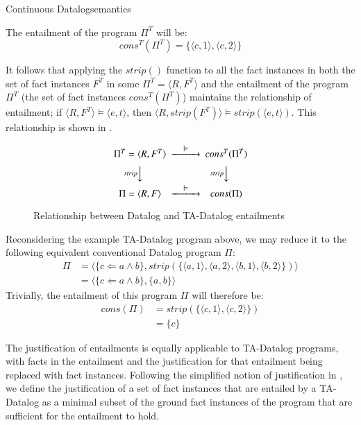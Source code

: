 \begin{nestedsection}{Continuous Datalog}{semantics}
\begin{definition}
The entailment of the program $\Pi^T$ will be:
\[cons^T(\Pi^T) = \{\langle c, 1 \rangle, \langle c, 2 \rangle\}\]

It follows that applying the ${strip()}$ function to all the fact
instances in both the set of fact instances $F^T$ in some ${\Pi^T =
  \langle R, F^T \rangle}$ and the entailment of the program $\Pi^T$
(the set of fact instances $cons^T(\Pi^T)$) maintains the relationship
of entailment; if $\langle R, F^T\rangle \models \langle e, t
\rangle$, then $\langle R, strip(F^T) \rangle \models strip(\langle e,
t \rangle)$. This relationship is shown in .

\begin{figure}[htb]
  \[
  \begin{CD}
\Pi^T = \langle R, F^T \rangle @>\models>> cons^T(\Pi^T) \\
@V{strip}VV @V{strip}VV \\
\Pi = \langle R, F \rangle @>\models>> cons(\Pi)
  \end{CD}
  \]
\caption{Relationship between Datalog and TA-Datalog entailments}
\end{figure}

Reconsidering the example TA-Datalog program above, we may reduce it
to the following equivalent conventional Datalog program $\Pi$:
\begin{align*}
\Pi &= \langle \{ c \Leftarrow a \land b \}, strip(\{ \langle a, 1 \rangle, \langle a, 2 \rangle, \langle b, 1 \rangle, \langle b, 2 \rangle \}) \rangle \\
    &= \langle \{ c \Leftarrow a \land b \}, \{ a, b \} \rangle
\end{align*}
Trivially, the entailment of this program $\Pi$ will therefore be:
\begin{align*}
cons(\Pi) &= strip(\{\langle c, 1 \rangle, \langle c, 2 \rangle\}) \\
 &= \{ c \}  
\end{align*}
\end{definition}

\begin{definition}

The justification of entailments is equally applicable to TA-Datalog
programs, with facts in the entailment and the justification for that
entailment being replaced with fact instances.  Following the
simplified notion of justification in , we define the justification of a set of fact
instances that are entailed by a TA-Datalog as a minimal subset of
the ground fact instances of the program that are sufficient for
the entailment to hold.


\end{definition}
\end{nestedsection}

